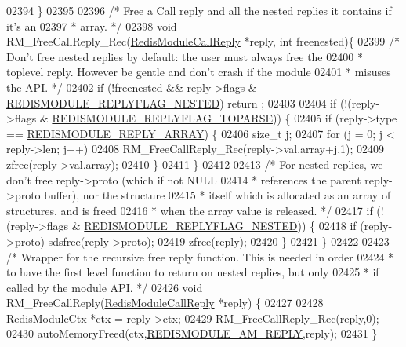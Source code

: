 \begin{DoxyCode}
{{{02394 \}
02395 
02396 \textcolor{comment}{/* Free a Call reply and all the nested replies it contains if it's an}
02397 \textcolor{comment}{ * array. */}
02398 \textcolor{keywordtype}{void} RM\_FreeCallReply\_Rec(\hyperlink{structRedisModuleCallReply}{RedisModuleCallReply} *reply, \textcolor{keywordtype}{int} freenested)\{
02399     \textcolor{comment}{/* Don't free nested replies by default: the user must always free the}
02400 \textcolor{comment}{     * toplevel reply. However be gentle and don't crash if the module}
02401 \textcolor{comment}{     * misuses the API. */}
02402     \textcolor{keywordflow}{if} (!freenested && reply->flags & \hyperlink{module_8c_a1605682f825f95f3de0c5bd149ecdff5}{REDISMODULE\_REPLYFLAG\_NESTED}) \textcolor{keywordflow}{return}
      ;
02403 
02404     \textcolor{keywordflow}{if} (!(reply->flags & \hyperlink{module_8c_a86d2a6b1f34cb5c7d5b69e4646ae0a7a}{REDISMODULE\_REPLYFLAG\_TOPARSE})) \{
02405         \textcolor{keywordflow}{if} (reply->type == \hyperlink{redismodule_8h_a2adb9d56c9d950784c3397cbe3f5d6af}{REDISMODULE\_REPLY\_ARRAY}) \{
02406             size\_t j;
02407             \textcolor{keywordflow}{for} (j = 0; j < reply->len; j++)
02408                 RM\_FreeCallReply\_Rec(reply->val.array+j,1);
02409             zfree(reply->val.array);
02410         \}
02411     \}
02412 
02413     \textcolor{comment}{/* For nested replies, we don't free reply->proto (which if not NULL}
02414 \textcolor{comment}{     * references the parent reply->proto buffer), nor the structure}
02415 \textcolor{comment}{     * itself which is allocated as an array of structures, and is freed}
02416 \textcolor{comment}{     * when the array value is released. */}
02417     \textcolor{keywordflow}{if} (!(reply->flags & \hyperlink{module_8c_a1605682f825f95f3de0c5bd149ecdff5}{REDISMODULE\_REPLYFLAG\_NESTED})) \{
02418         \textcolor{keywordflow}{if} (reply->proto) sdsfree(reply->proto);
02419         zfree(reply);
02420     \}
02421 \}
02422 
02423 \textcolor{comment}{/* Wrapper for the recursive free reply function. This is needed in order}
02424 \textcolor{comment}{ * to have the first level function to return on nested replies, but only}
02425 \textcolor{comment}{ * if called by the module API. */}
02426 \textcolor{keywordtype}{void} RM\_FreeCallReply(\hyperlink{structRedisModuleCallReply}{RedisModuleCallReply} *reply) \{
02427 
02428     RedisModuleCtx *ctx = reply->ctx;
02429     RM\_FreeCallReply\_Rec(reply,0);
02430     autoMemoryFreed(ctx,\hyperlink{module_8c_a3a23ca3942d52889333fbd34f6efcffe}{REDISMODULE\_AM\_REPLY},reply);
02431 \}
}}}
\end{DoxyCode}

